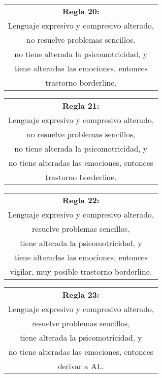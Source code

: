 \documentclass[letterpaper,12pt]{article}
\begin{document}
\begin{center}
	\begin{tabular}{|c|}
		\hline 
		\textbf{Regla 20:} \\
		Lenguaje expresivo y compresivo alterado,\\
		no resuelve problemas sencillos,\\
		no tiene alterada la psicomotricidad, y\\
		tiene alteradas las emociones, entonces\\
		trastorno borderline.\\
	\hline 
\end{tabular} 
\end{center}	
		
\begin{center}
	\begin{tabular}{|c|}
		\hline 
		\textbf{Regla 21:} \\
		Lenguaje expresivo y compresivo alterado,\\
		no resuelve problemas sencillos,\\
		no tiene alterada la psicomotricidad, y\\
		no tiene alteradas las emociones, entonces\\
		trastorno borderline.\\
	\hline 
\end{tabular} 
\end{center}	
		
\begin{center}
	\begin{tabular}{|c|}
		\hline 
		\textbf{Regla 22:} \\
		Lenguaje expresivo y compresivo alterado,\\
		resuelve problemas sencillos,\\
		tiene alterada la psicomotricidad, y\\
		tiene alteradas las emociones, entonces\\
		vigilar, muy posible trastorno borderline.\\
	\hline 
\end{tabular} 
\end{center}	
		
\begin{center}
	\begin{tabular}{|c|}
		\hline 
		\textbf{Regla 23:} \\
		Lenguaje expresivo y compresivo alterado,\\
		resuelve problemas sencillos,\\
		tiene alterada la psicomotricidad, y\\
		no tiene alteradas las emociones, entonces\\
		derivar a AL. \\
	\hline 
\end{tabular} 
\end{center}	
		
\end{document}
